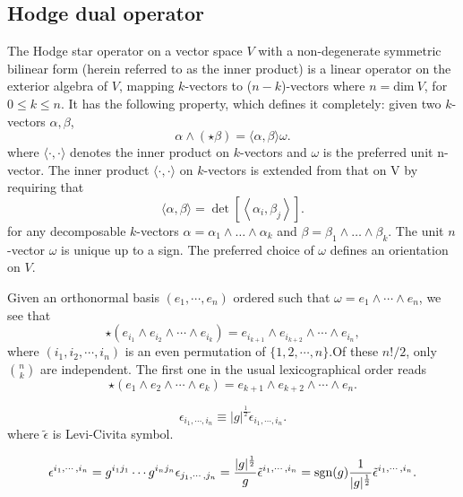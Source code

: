 \subsection{Hodge dual operator}
\begin{newdef}
The Hodge star operator on a vector space $V$ with a non-degenerate symmetric bilinear form (herein referred to as the inner product) is a linear operator on the exterior algebra of $V$, mapping $k$-vectors to ($n-k$)-vectors where $n = \text{dim} \ V$, for $ 0 \leq k \leq n$. It has the following property, which defines it completely: given two $k$-vectors $\alpha,\beta$,
\[\alpha \wedge (\star \beta )=\langle \alpha ,\beta \rangle \omega.\]
where $\langle \cdot ,\cdot \rangle$ denotes the inner product on $k$-vectors and $\omega$ is the preferred unit n-vector.
The inner product $\langle \cdot ,\cdot \rangle$ on $k$-vectors is extended from that on V by requiring that
\[\langle \alpha ,\beta \rangle =\det \left[\left\langle \alpha _{i},\beta _{j}\right\rangle \right].\]
for any decomposable $k$-vectors $\alpha =\alpha _{1}\wedge \dots \wedge \alpha _{k}$ and $\beta =\beta _{1}\wedge \dots \wedge \beta _{k}$. The unit $n$-vector $\omega$ is unique up to a sign. The preferred choice of $\omega$ defines an orientation on $V$.
\end{newdef}
\noindent
Given an orthonormal basis $(e_{1},\cdots ,e_{n})$ ordered such that $\omega =e_{1}\wedge \cdots \wedge e_{n}$, we see that
\[\star (e_{i_{1}}\wedge e_{i_{2}}\wedge \cdots \wedge e_{i_{k}})=e_{i_{k+1}}\wedge e_{i_{k+2}}\wedge \cdots \wedge e_{i_{n}},\]
where $(i_{1},i_{2},\cdots ,i_{n})$ is an even permutation of $\{1,2,\cdots,n\}$.Of these $n!/2$, only $n \choose k$ are independent. The first one in the usual lexicographical order reads
\[\star (e_{1}\wedge e_{2}\wedge \cdots \wedge e_{k})=e_{k+1}\wedge e_{k+2}\wedge \cdots \wedge e_{n}.\]

\begin{newdef}
\[\epsilon_{i_1,\cdots,i_n} \equiv |g|^{\frac{1}{2}} \tilde{\epsilon}_{i_1,\cdots,i_n} .\]
where $\tilde{\epsilon}$ is Levi-Civita symbol.
\end{newdef}
\begin{newprop}
\[\epsilon^{i_1,\cdots,i_n} = g^{i_1j_1} \cdots g^{i_nj_n} \epsilon_{j_1,\cdots,j_n} = \frac{|g|^{\frac{1}{2}}}{g} \tilde{\epsilon}^{i_1,\cdots,i_n} = {\rm sgn}(g) \frac{1}{|g|^{\frac{1}{2}}} \tilde{\epsilon}^{i_1,\cdots,i_n}.\]
\end{newprop}

